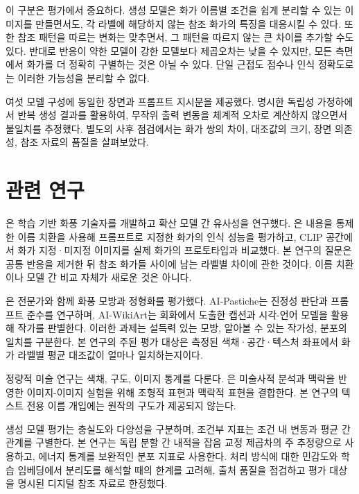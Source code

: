 \documentclass[11pt,a4paper]{article}
\begin{document}
이 구분은 평가에서 중요하다. 생성 모델은 화가 이름별 조건을 쉽게 분리할 수 있는 이미지를 만들면서도, 각 라벨에 해당하지 않는 참조 화가의 특징을 대응시킬 수 있다. 또한 참조 패턴을 따르는 변화는 맞추면서, 그 패턴을 따르지 않는 큰 차이를 추가할 수도 있다. 반대로 반응이 약한 모델이 강한 모델보다 제곱오차는 낮을 수 있지만, 모든 측면에서 화가를 더 정확히 구별하는 것은 아닐 수 있다. 단일 근접도 점수나 인식 정확도로는 이러한 가능성을 분리할 수 없다.

여섯 모델 구성에 동일한 장면과 프롬프트 지시문을 제공했다. 명시한 독립성 가정하에서 반복 생성 결과를 활용하여, 무작위 출력 변동을 체계적 오차로 계산하지 않으면서 불일치를 추정했다. 별도의 사후 점검에서는 화가 쌍의 차이, 대조값의 크기, 장면 의존성, 참조 자료의 품질을 살펴보았다.

\section{관련 연구}
\citet{somepalli2024style}은 학습 기반 화풍 기술자를 개발하고 확산 모델 간 유사성을 연구했다. \citet{su2025prompted}은 내용을 통제한 이름 치환을 사용해 프롬프트로 지정한 화가의 인식 성능을 평가하고, CLIP 공간에서 화가 지정·미지정 이미지를 실제 화가의 프로토타입과 비교했다. 본 연구의 질문은 공통 반응을 제거한 뒤 참조 화가들 사이에 남는 라벨별 차이에 관한 것이다. 이름 치환이나 모델 간 비교 자체가 새로운 것은 아니다.

\citet{deliege2025}은 전문가와 함께 화풍 모방과 정형화를 평가했다. AI-Pastiche는 진정성 판단과 프롬프트 준수를 연구하며\citep{asperti2025pastiche}, AI-WikiArt는 회화에서 도출한 캡션과 시각-언어 모델을 활용해 작가를 판별한다\citep{fu2025aiwikiart}. 이러한 과제는 설득력 있는 모방, 알아볼 수 있는 작가성, 분포의 일치를 구분한다. 본 연구의 주된 평가 대상은 측정된 색채·공간·텍스처 좌표에서 화가 라벨별 평균 대조값이 얼마나 일치하는지이다.

정량적 미술 연구는 색채, 구도, 이미지 통계를 다룬다\citep{kim2014,sigaki2018,lee2020}. \citet{kim2026}은 미술사적 분석과 맥락을 반영한 이미지-이미지 실험을 위해 조형적 표현과 맥락적 표현을 결합한다. 본 연구의 텍스트 전용 이름 개입에는 원작의 구도가 제공되지 않는다.

생성 모델 평가는 충실도와 다양성을 구분하며\citep{naeem2020}, 조건부 지표는 조건 내 변동과 평균 간 관계를 구별한다\citep{benny2021conditional}. 본 연구는 독립 분할 간 내적을 잡음 교정 제곱차의 주 추정량으로 사용하고\citep{diedrichsen2017representational}, 에너지 통계를 보완적인 분포 지표로 사용한다\citep{szekely2013}. 처리 방식에 대한 민감도\citep{parmar2022}와 학습 임베딩에서 분리도를 해석할 때의 한계\citep{asperti2026}를 고려해, 출처 품질을 점검하고 평가 대상을 명시된 디지털 참조 자료로 한정했다.
\end{document}
